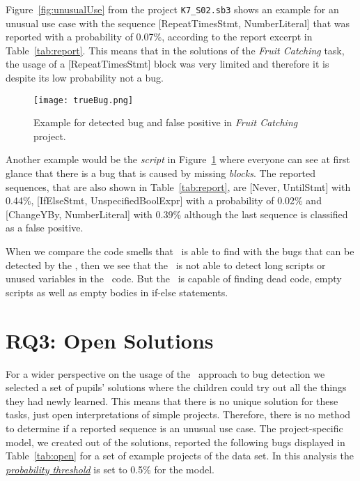 Figure~\ref{fig:unusualUse} from the project \texttt{K7\_S02.sb3} shows an example for an unusual use case with the sequence [RepeatTimesStmt, NumberLiteral] that was reported with a probability of 0.07\%, according to the report excerpt in Table~\ref{tab:report}. This means that in the solutions of the \textit{Fruit Catching} task, the usage of a [RepeatTimesStmt] block was very limited and therefore it is despite its low probability not a bug.  

\begin{figure}[H]
    \centering
    \texttt{[image: trueBug.png]}
    \caption[Example for detected bug and false positive in \textit{Fruit Catching} project]{\label{fig:trueBug}Example for detected bug and false positive in \textit{Fruit Catching} project.}
\end{figure}

Another example would be the \textit{script} in Figure~\ref{fig:trueBug} where everyone can see at first glance that there is a bug that is caused by missing \textit{blocks}. The reported sequences, that are also shown in Table~\ref{tab:report}, are [Never, UntilStmt] with 0.44\%, [IfElseStmt, UnspecifiedBoolExpr] with a probability of 0.02\% and [ChangeYBy, NumberLiteral] with 0.39\% although the last sequence is classified as a false positive. 

When we compare the code smells that \litterbox\ is able to find with the bugs that can be detected by the \ngram{}, then we see that the \ngram\ is not able to detect long scripts or unused variables in the \scratch\ code. But the \ngram\ is capable of finding dead code, empty scripts as well as empty bodies in if-else statements. 
 

\section{RQ3: Open Solutions}\label{sec:open}
For a wider perspective on the usage of the \ngram\ approach to bug detection we selected a set of pupils' solutions where the children could try out all the things they had newly learned. This means that there is no unique solution for these tasks, just open interpretations of simple projects. Therefore, there is no method to determine if a reported sequence is an unusual use case. The project-specific model, we created out of the solutions, reported the following bugs displayed in Table~\ref{tab:open} for a set of example projects of the data set. In this analysis the \hyperref[def:probability_threshold]{\textit{probability threshold}} is set to 0.5\% for the model. 


